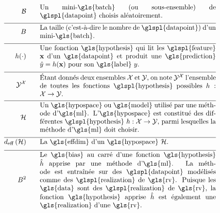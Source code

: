 \begin{align}
	\batch \quad\quad &\parbox{.75\textwidth}{Un mini-\gls{batch} (ou sous-ensemble) de \glspl{datapoint} choisis aléatoirement.}\nonumber \\[2mm] \hline \nonumber\\[-5mm]
	\batchsize \quad\quad &\parbox{.75\textwidth}{La taille (c’est-à-dire le nombre de \glspl{datapoint}) d’un mini-\gls{batch}.}\nonumber \\[2mm] \hline \nonumber\\[-5mm]
	\hypothesis(\cdot)  \quad\quad &\parbox{.75\textwidth}{Une fonction \gls{hypothesis} qui lit les \glspl{feature} $\featurevec$ d’un \gls{datapoint} et produit une \gls{prediction} $\hat{\truelabel}=\hypothesis(\featurevec)$ pour son \gls{label} $\truelabel$.}  	 \nonumber \\[2mm] \hline \nonumber\\[-5mm]
	\labelspace^{\featurespace} \quad\quad & \parbox{.75\textwidth}{Étant donnés deux ensembles $\featurespace$ et $\labelspace$, on note $\labelspace^{\featurespace}$ l’ensemble de toutes les fonctions \glspl{hypothesis} possibles $\hypothesis: \featurespace \rightarrow \labelspace$.}  	 \nonumber \\[2mm] \hline \nonumber\\[-5mm]
	\hypospace  \quad\quad & \parbox{.75\textwidth}{Un \gls{hypospace} ou \gls{model} utilisé par une méthode d’\gls{ml}. L'\gls{hypospace} est constitué des différentes \glspl{hypothesis} $\hypothesis: \featurespace \rightarrow \labelspace$, parmi lesquelles la méthode d’\gls{ml} doit choisir.}   \nonumber \\[2mm] \hline \nonumber\\[-5mm]
	\effdim{\hypospace}  \quad\quad & \parbox{.75\textwidth}{La \gls{effdim} d’un \gls{hypospace} $\hypospace$.}   \nonumber \\[2mm] \hline \nonumber\\[-5mm]
	\biasterm^2 \quad\quad &\parbox{.75\textwidth}{
		Le \gls{bias} au carré d’une fonction \gls{hypothesis} $\learnthypothesis$ apprise par une méthode d’\gls{ml}. La méthode est entraînée sur des \glspl{datapoint} modélisés comme des \glspl{realization} de \gls{rv}. Puisque les \gls{data} sont des \glspl{realization} de \gls{rv}, la fonction \gls{hypothesis} apprise $\learnthypothesis$ est également une \gls{realization} d’une \gls{rv}.} \nonumber                             
\end{align}

